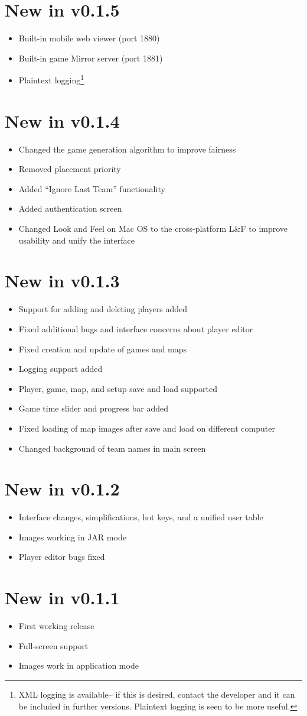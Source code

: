 \documentclass[10pt,a4paper]{report}
\begin{document}
\section{New in v0.1.5}
\begin{itemize}
\item Built-in mobile web viewer (port 1880)
\item Built-in game Mirror server (port 1881)
\item Plaintext logging\footnote{XML logging is available-- if this is desired, contact the developer and it can be included in further versions.  Plaintext logging is seen to be more useful.}
\end{itemize}
\section{New in v0.1.4}
\begin{itemize}
\item Changed the game generation algorithm to improve fairness
\item Removed placement priority
\item Added ``Ignore Last Team'' functionality
\item Added authentication screen
\item Changed Look and Feel on Mac OS to the cross-platform L\&F to improve usability and unify the interface
\end{itemize}
\section{New in v0.1.3}
\begin{itemize}
\item Support for adding and deleting players added
\item Fixed additional bugs and interface concerns about player editor
\item Fixed creation and update of games and maps
\item Logging support added
\item Player, game, map, and setup save and load supported
\item Game time slider and progress bar added
\item Fixed loading of map images after save and load on different computer
\item Changed background of team names in main screen
\end{itemize}
\section{New in v0.1.2}
\begin{itemize}
\item Interface changes, simplifications, hot keys, and a unified user table
\item Images working in JAR mode
\item Player editor bugs fixed
\end{itemize}
\section{New in v0.1.1}
\begin{itemize}
\item First working release
\item Full-screen support
\item Images work in application mode
\end{itemize}
\end{document}
